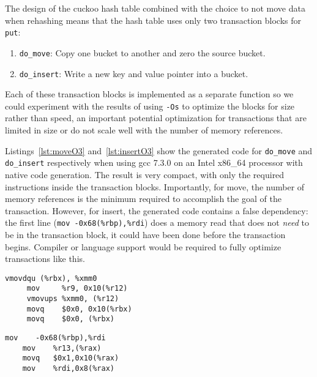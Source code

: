 The design of the cuckoo hash table combined with the choice to not move data
when rehashing means that the hash table uses only two transaction blocks for
\texttt{put}:
\begin{enumerate}
\item \texttt{do\_move}: Copy one bucket to another and zero the source bucket.
\item \texttt{do\_insert}: Write a new key and value pointer into a bucket.
\end{enumerate}
Each of these transaction blocks is implemented as a separate function so we
could experiment with the results of using \texttt{-Os} to optimize the blocks
for size rather than speed, an important potential optimization for
transactions that are limited in size or do not scale well with the number of
memory references.

Listings~\ref{lst:moveO3} and~\ref{lst:insertO3} show the generated code for
\texttt{do\_move} and \texttt{do\_insert} respectively when using gcc 7.3.0 on
an Intel x86\_64 processor with native code generation. The result is very
compact, with only the required instructions inside the transaction blocks.
Importantly, for move, the number of memory references is the minimum required to
accomplish the goal of the transaction. However, for insert, the generated code
contains a false dependency: the first line (\texttt{mov -0x68(\%rbp),\%rdi})
does a memory read that does not \textit{need} to be in the transaction block,
it could have been done before the transaction begins.
Compiler or language support would be required to fully optimize transactions
like this.


\begin{lstlisting}[caption={Transaction code generations for do\_move, optimized for speed.
Five instructions, five memory accesses (four writes).},label={lst:moveO3}]
     vmovdqu (%rbx), %xmm0
     mov     %r9, 0x10(%r12)
     vmovups %xmm0, (%r12)
     movq    $0x0, 0x10(%rbx)
     movq    $0x0, (%rbx)
\end{lstlisting}

\begin{lstlisting}[caption={Transaction code generation for do\_insert, optimized for speed.
Four instructions, four memory accesses (three writes).},label=lst:insertO3]
    mov    -0x68(%rbp),%rdi
    mov    %r13,(%rax)
    movq   $0x1,0x10(%rax)
    mov    %rdi,0x8(%rax)
\end{lstlisting}

